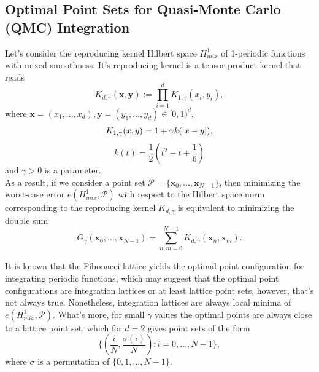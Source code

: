 \subsection{Optimal Point Sets for Quasi-Monte Carlo (QMC) Integration}

Let's consider the reproducing kernel Hilbert space $H_{mix}^1$ of 1-periodic functions with mixed smoothness. It's reproducing kernel is a tensor product kernel that reads
\begin{equation*}
    K_{d,\gamma}(\textbf{x},\textbf{y}) := \prod_{i=1}^{d} K_{1,\gamma}(x_i,y_i),
\end{equation*}
where $\textbf{x}=(x_1,...,x_d), \textbf{y}=(y_1,...,y_d)\in [0,1)^d$, 
\begin{equation*}
    K_{1,\gamma}(x,y) = 1 + \gamma k(\lvert x-y\rvert),
\end{equation*}
\begin{equation*}
    k(t) = \frac{1}{2} (t^2 - t + \frac{1}{6})
\end{equation*}
and $\gamma > 0$ is a parameter. \\

As a result, if we consider a point set $\mathcal{P} = \{ \textbf{x}_0,...,\textbf{x}_{N-1} \}$, then minimizing the worst-case error $e(H_{mix}^1,\mathcal{P})$ with respect to the Hilbert space norm corresponding to the reproducing kernel $K_{d,\gamma}$ is equivalent to minimizing the double sum
\begin{equation*}
    G_{\gamma}(\textbf{x}_0,...,\textbf{x}_{N-1}) = \sum_{n,m=0}^{N-1} K_{d,\gamma}(\textbf{x}_n,\textbf{x}_m).
\end{equation*}

It is known that the Fibonacci lattice yields the optimal point configuration for integrating periodic functions, which may suggest that the optimal point configurations are integration lattices or at least lattice point sets, however, that's not always true. Nonetheless, integration lattices are always local minima of $e(H_{mix}^1,\mathcal{P})$. What's more, for small $\gamma$ values the optimal points are always close to a lattice point set, which for $d=2$ gives point sets of the form
\begin{equation*}
    \Bigg\{ \left(\frac{i}{N},\frac{\sigma(i)}{N}\right) : i=0,...,N-1 \Bigg\},
\end{equation*}
where $\sigma$ is a permutation of $\{ 0,1,...,N-1 \}$.\\


